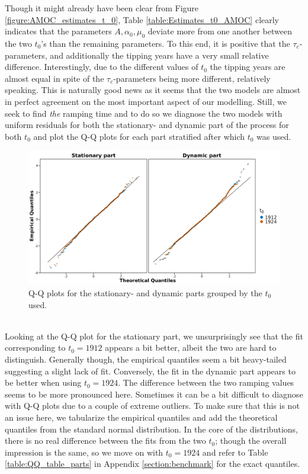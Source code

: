 Though it might already have been clear from Figure \ref{figure:AMOC_estimates_t_0}, Table \ref{table:Estimates_t0_AMOC} clearly indicates that the parameters $A, \alpha_0, \mu_0$ deviate more from one another between the two $t_0$'s than the remaining parameters. To this end, it is positive that the $\tau_c$-parameters, and additionally the tipping years have a very small relative difference. Interestingly, due to the different values of $t_0$ the tipping years are almost equal in spite of the $\tau_c$-parameters being more different, relatively speaking. This is naturally good news as it seems that the two models are almost in perfect agreement on the most important aspect of our modelling. Still, we seek to find \textit{the} ramping time and to do so we diagnose the two models with uniform residuals for both the stationary- and dynamic part of the process for both $t_0$ and plot the Q-Q plots for each part stratified after which $t_0$ was used.
\begin{figure}[h!]
    \begin{center}
        \includegraphics[scale = .09]{figures/QQ_plot_parts.jpeg}
        \caption{Q-Q plots for the stationary- and dynamic parts grouped by the $t_0$ used.}
        \label{figure:AMOC_QQ_t_0}
    \end{center}
\end{figure}\\
Looking at the Q-Q plot for the stationary part, we unsurprisingly see that the fit corresponding to $t_0 = 1912$ appears a bit better, albeit the two are hard to distinguish. Generally though, the empirical quantiles seem a bit heavy-tailed suggesting a slight lack of fit. Conversely, the fit in the dynamic part appears to be better when using $t_0 = 1924$. The difference between the two ramping values seems to be more pronounced here. Sometimes it can be a bit difficult to diagnose with Q-Q plots due to a couple of extreme outliers. To make sure that this is not an issue here, we tabularize the empirical quantiles and add the theoretical quantiles from the standard normal distribution. In the core of the distributions, there is no real difference between the fits from the two $t_0$; though the overall impression is the same, so we move on with $t_0 = 1924$ and refer to Table \ref{table:QQ_table_parts} in Appendix \ref{section:benchmark} for the exact quantiles.\newpage 
